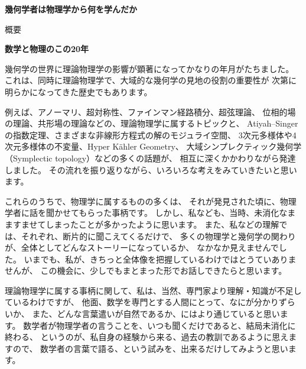 \documentclass[uplatex,dvipdfmx]{jlreq}
\begin{document}
\begin{center}
  \vspace*{20pt}
  {\Huge\bfseries 幾何学者は物理学から何を学んだか}

  \vspace{1pc}
  {\Large 概要}
\end{center}

\vfill

\newpage

\noindent
{\large\bfseries 数学と物理のこの20年}

\bigskip
\hspace*{\fill}{\large\bfseries 深谷　賢治（京大・理）}

\bigskip

幾何学の世界に理論物理学の影響が顕著になってかなりの年月がたちました。
これは、同時に理論物理学で、大域的な幾何学の見地の役割の重要性が
次第に明らかになってきた歴史でもあります。

例えば、アノーマリ、超対称性、ファインマン経路積分、超弦理論、
位相的場の理論、共形場の理論などの、理論物理学に属するトピックと、
Atiyah--Singer の指数定理、さまざまな非線形方程式の解のモジュライ空間、
3次元多様体や4次元多様体の不変量、Hyper Kähler Geometry、
大域シンプレクティック幾何学（Symplectic topology）などの多くの話題が、
相互に深くかかわりながら発達しました。
その流れを振り返りながら、いろいろな考えをみていきたいと思います。

これらのうちで、物理学に属するものの多くは、
それが発見された頃に、物理学者に話を聞かせてもらった事柄です。
しかし、私なども、当時、未消化なまますませてしまったことが多かったように思います。
また、私などの理解では、それぞれ、断片的に聞こえてくるだけで、
多くの物理学と幾何学の関わりが、全体としてどんなストーリーになっているか、
なかなか見えませんでした。
いまでも、私が、きちっと全体像を把握しているわけではとうていありませんが、
この機会に、少しでもまとまった形でお話しできたらと思います。

理論物理学に属する事柄に関して、私は、当然、専門家より理解・知識が不足しているわけですが、
他面、数学を専門とする人間にとって、なにが分かりずらいか、
また、どんな言葉遣いが自然であるか、にはより通じていると思います。
数学者が物理学者の言うことを、いつも聞くだけであると、結局未消化に終わる、
というのが、私自身の経験から来る、過去の教訓であるように思えますので、
数学者の言葉で語る、という試みを、出来るだけしてみようと思います。
\end{document}
